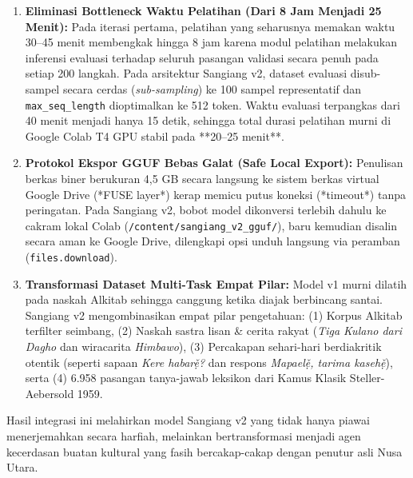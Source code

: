 \begin{enumerate}
    \item \textbf{Eliminasi Bottleneck Waktu Pelatihan (Dari 8 Jam Menjadi 25 Menit):}
    Pada iterasi pertama, pelatihan yang seharusnya memakan waktu 30--45 menit membengkak hingga 8 jam karena modul pelatihan melakukan inferensi evaluasi terhadap seluruh \StatValPairs{} pasangan validasi secara penuh pada setiap 200 langkah. Pada arsitektur Sangiang v2, dataset evaluasi disub-sampel secara cerdas (\textit{sub-sampling}) ke 100 sampel representatif dan \texttt{max\_seq\_length} dioptimalkan ke 512 token. Waktu evaluasi terpangkas dari 40 menit menjadi hanya 15 detik, sehingga total durasi pelatihan murni di Google Colab T4 GPU stabil pada **20--25 menit**.

    \item \textbf{Protokol Ekspor GGUF Bebas Galat (Safe Local Export):}
    Penulisan berkas biner berukuran 4,5 GB secara langsung ke sistem berkas virtual Google Drive (*FUSE layer*) kerap memicu putus koneksi (*timeout*) tanpa peringatan. Pada Sangiang v2, bobot model dikonversi terlebih dahulu ke cakram lokal Colab (\texttt{/content/sangiang\_v2\_gguf/}), baru kemudian disalin secara aman ke Google Drive, dilengkapi opsi unduh langsung via peramban (\texttt{files.download}).

    \item \textbf{Transformasi Dataset Multi-Task Empat Pilar:}
    Model v1 murni dilatih pada naskah Alkitab sehingga canggung ketika diajak berbincang santai. Sangiang v2 mengombinasikan empat pilar pengetahuan: (1) Korpus Alkitab terfilter seimbang, (2) Naskah sastra lisan \& cerita rakyat (\textit{Tiga Kulano dari Dagho} dan wiracarita \textit{Himbawo}), (3) Percakapan sehari-hari berdiakritik otentik (seperti sapaan \textit{Kere habarẹ̌?} dan respons \textit{Mapaelẹ̌, tarima kasehẹ̌}), serta (4) 6.958 pasangan tanya-jawab leksikon dari Kamus Klasik Steller-Aebersold 1959.
\end{enumerate}
Hasil integrasi ini melahirkan model Sangiang v2 yang tidak hanya piawai menerjemahkan secara harfiah, melainkan bertransformasi menjadi agen kecerdasan buatan kultural yang fasih bercakap-cakap dengan penutur asli Nusa Utara.
